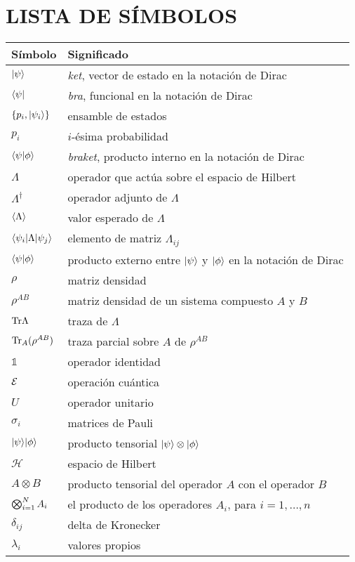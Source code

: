 


\chapter*{LISTA DE SÍMBOLOS} 

\begin{longtable}{@{}l@{\extracolsep{\fill}} p{4.75in} @{}}  %
  \textsf{Símbolo} & \textsf{Significado}\\[12pt]
  \endhead{}
 $|\psi\rangle$ &  \textit{ket}, vector de estado en la notación de Dirac \\
  $\langle\psi|$ & \textit{bra}, funcional en la notación de Dirac\\
  $\{p_i,|\psi_i\rangle\}$ & ensamble de estados \\
  $p_i$ & $i$-ésima probabilidad\\
  $\langle\psi|\phi\rangle$ & \textit{braket}, producto interno en la notación de Dirac\\
  $\Lambda$ &  operador que actúa sobre el espacio de Hilbert\\
  $\Lambda^{\dagger}$ & operador adjunto de $\Lambda$\\
  $\langle{\Lambda}\rangle$ & valor esperado de $\Lambda$\\
  $\langle\psi_i|\Lambda|\psi_j\rangle$ & elemento de matriz $\Lambda_{ij}$\\
  $\langle \psi|\phi \rangle $ & producto externo entre $|\psi\rangle$ y $|\phi\rangle$ en la notación de Dirac \\
  $\rho$ & matriz densidad\\
  $\rho^{AB}$ & matriz densidad de un sistema compuesto $A$ y $B$\\
  ${\rm Tr} \Lambda$ & traza de $\Lambda$\\
  ${\rm Tr}_{A}(\rho^{AB})$ & traza parcial sobre $A$ de $\rho^{AB}$\\
  $\mathds{1}$ & operador identidad \\
  $\mathcal{E}$ & operación cuántica \\
  $U$ & operador unitario \\
  $\sigma_i$ & matrices de Pauli\\
  $| \psi\rangle|\phi\rangle$ & producto tensorial $|\psi\rangle\otimes|\phi\rangle$\\
  $\mathcal{H}$ & espacio de Hilbert\\
  $A{\otimes} B$  & producto tensorial del operador $A$ con el operador $B$\\
  $\bigotimes_{i=1}^{N} A_i$& el producto de los operadores $A_i$, para $i=1,\hdots, n$\\ 
  $\delta_{ij}$ & delta de Kronecker\\
 $\lambda_i$ & valores propios
\end{longtable}
